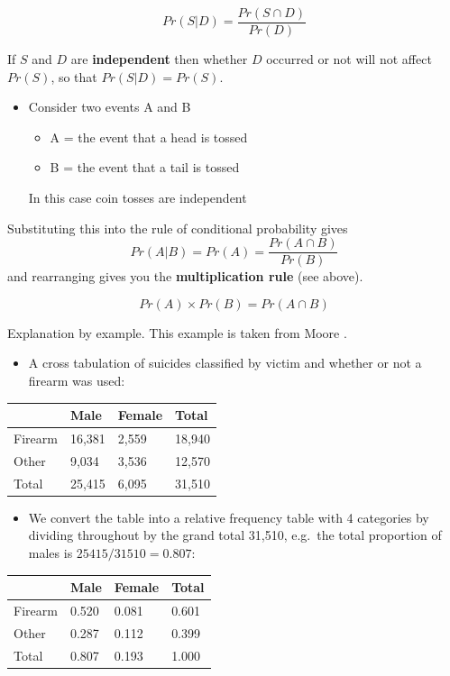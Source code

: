 \documentclass[
  oneside]{krantz}
\providecommand{\tightlist}{%
  \setlength{\itemsep}{0pt}\setlength{\parskip}{0pt}}
\begin{document}
\[Pr(S|D) = \frac{Pr(S \cap D)}{Pr(D)}\]

If \(S\) and \(D\) are \textbf{independent} then whether \(D\) occurred or not will not affect \(Pr(S)\), so that \(Pr(S|D) = Pr(S)\).

\begin{itemize}
\item
  Consider two events A and B

  \begin{itemize}
  \tightlist
  \item
    A = the event that a head is tossed
  \item
    B = the event that a tail is tossed
  \end{itemize}

  In this case coin tosses are independent
\end{itemize}

Substituting this into the rule of conditional probability gives
\[Pr(A|B) = Pr(A) = \frac{Pr(A \cap B)} {Pr(B)}\]
and rearranging gives you the \textbf{multiplication rule} (see above).

\[ Pr(A) \times Pr(B) = Pr(A \cap B) \]

Explanation by example. This example is taken from Moore \citeyearpar{Moore1992}.

\begin{itemize}
\tightlist
\item
  A cross tabulation of suicides classified by victim and whether or not a firearm was used:
\end{itemize}

\begin{longtable}[]{@{}llll@{}}
\toprule
& Male & Female & Total\tabularnewline
\midrule
\endhead
Firearm & 16,381 & 2,559 & 18,940\tabularnewline
Other & 9,034 & 3,536 & 12,570\tabularnewline
Total & 25,415 & 6,095 & 31,510\tabularnewline
\bottomrule
\end{longtable}

\begin{itemize}
\tightlist
\item
  We convert the table into a relative frequency table with 4 categories by dividing throughout by the grand total 31,510, e.g.~the total proportion of males is \(25415/31510 = 0.807\):
\end{itemize}

\begin{longtable}[]{@{}llll@{}}
\toprule
& Male & Female & Total\tabularnewline
\midrule
\endhead
Firearm & 0.520 & 0.081 & 0.601\tabularnewline
Other & 0.287 & 0.112 & 0.399\tabularnewline
Total & 0.807 & 0.193 & 1.000\tabularnewline
\bottomrule
\end{longtable}
\end{document}
